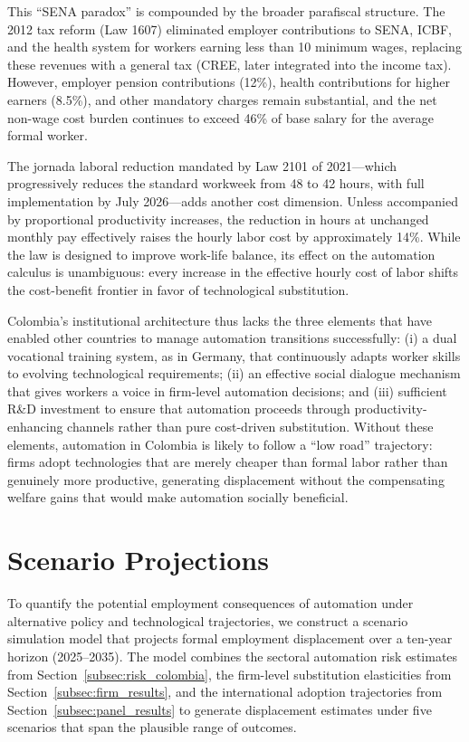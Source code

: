 \documentclass{article}
\begin{document}
This ``SENA paradox'' is compounded by the broader parafiscal structure. The 2012 tax reform (Law 1607) eliminated employer contributions to SENA, ICBF, and the health system for workers earning less than 10 minimum wages, replacing these revenues with a general tax (CREE, later integrated into the income tax). However, employer pension contributions (12\%), health contributions for higher earners (8.5\%), and other mandatory charges remain substantial, and the net non-wage cost burden continues to exceed 46\% of base salary for the average formal worker.

The jornada laboral reduction mandated by Law 2101 of 2021---which progressively reduces the standard workweek from 48 to 42 hours, with full implementation by July 2026---adds another cost dimension. Unless accompanied by proportional productivity increases, the reduction in hours at unchanged monthly pay effectively raises the hourly labor cost by approximately 14\%. While the law is designed to improve work-life balance, its effect on the automation calculus is unambiguous: every increase in the effective hourly cost of labor shifts the cost-benefit frontier in favor of technological substitution.

Colombia's institutional architecture thus lacks the three elements that have enabled other countries to manage automation transitions successfully: (i) a dual vocational training system, as in Germany, that continuously adapts worker skills to evolving technological requirements; (ii) an effective social dialogue mechanism that gives workers a voice in firm-level automation decisions; and (iii) sufficient R\&D investment to ensure that automation proceeds through productivity-enhancing channels rather than pure cost-driven substitution. Without these elements, automation in Colombia is likely to follow a ``low road'' trajectory: firms adopt technologies that are merely cheaper than formal labor rather than genuinely more productive, generating displacement without the compensating welfare gains that would make automation socially beneficial.

\FloatBarrier
\section{Scenario Projections}
\label{sec:scenarios}

To quantify the potential employment consequences of automation under alternative policy and technological trajectories, we construct a scenario simulation model that projects formal employment displacement over a ten-year horizon (2025--2035). The model combines the sectoral automation risk estimates from Section~\ref{subsec:risk_colombia}, the firm-level substitution elasticities from Section~\ref{subsec:firm_results}, and the international adoption trajectories from Section~\ref{subsec:panel_results} to generate displacement estimates under five scenarios that span the plausible range of outcomes.
\end{document}
